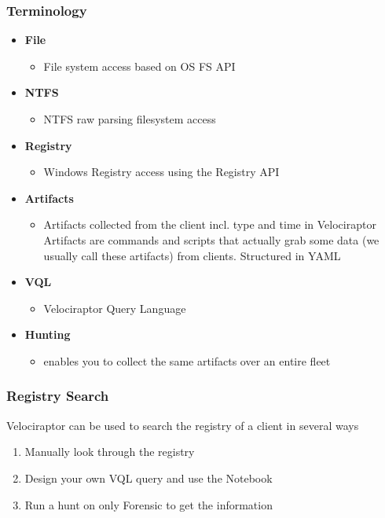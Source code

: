 \subsubsection{Terminology}
\begin{itemize}
    \item \textbf{File}
    \begin{itemize}
        \item  File system access based on OS FS API
    \end{itemize}
    \item \textbf{NTFS}
    \begin{itemize}
        \item NTFS raw parsing filesystem access
    \end{itemize}
    \item \textbf{Registry}
    \begin{itemize}
        \item Windows Registry access using the Registry API
    \end{itemize}
    \item \textbf{Artifacts}
    \begin{itemize}
        \item Artifacts collected from the client incl. type and time in Velociraptor Artifacts are commands and scripts that actually grab some data (we usually call these artifacts) from clients. Structured in YAML
    \end{itemize}
    \item \textbf{VQL}
    \begin{itemize}
        \item Velociraptor Query Language
    \end{itemize}
    \item \textbf{Hunting}
    \begin{itemize}
        \item enables you to collect the same artifacts over an entire fleet
    \end{itemize}
\end{itemize}

\subsubsection{Registry Search}
Velociraptor can be used to search the registry of a client in several ways
\begin{enumerate}
    \item Manually look through the registry
    \item Design your own VQL query and use the Notebook
    \item Run a hunt on only Forensic to get the information
\end{enumerate}

